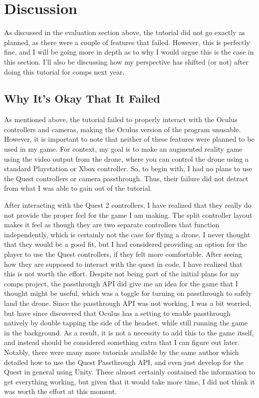\documentclass[10pt,twocolumn]{article}
\begin{document}
\section{Discussion}
As discussed in the evaluation section above, the tutorial did not go exactly as planned, as there were a couple of features that failed. However, this is perfectly fine, and I will be going more in depth as to why I would argue this is the case in this section. I'll also be discussing how my perspective has shifted (or not) after doing this tutorial for comps next year.


\subsection{Why It's Okay That It Failed}
As mentioned above, the tutorial failed to properly interact with the Oculus controllers and cameras, making the Oculus version of the program unusable. However, it is important to note that neither of these features were planned to be used in my game. For context, my goal is to make an augmented reality game using the video output from the drone, where you can control the drone using a standard Playstation or Xbox controller. So, to begin with, I had no plans to use the Quest controllers or camera passthrough. Thus, their failure did not detract from what I was able to gain out of the tutorial.

After interacting with the Quest 2 controllers, I have realized that they really do not provide the proper feel for the game I am making. The split controller layout makes it feel as though they are two separate controllers that function independently, which is certainly not the case for flying a drone. I never thought that they would be a good fit, but I had considered providing an option for the player to use the Quest controllers, if they felt more comfortable. After seeing how they are supposed to interact with the quest in code, I have realized that this is not worth the effort. Despite not being part of the initial plans for my comps project, the passthrough API did give me an idea for the game that I thought might be useful, which was a toggle for turning on passthrough to safely land the drone. Since the passthrough API was not working, I was a bit worried, but have since discovered that Oculus has a setting to enable passthrough natively by double tapping the side of the headset, while still running the game in the background. As a result, it is not a necessity to add this to the game itself, and instead should be considered something extra that I can figure out later. Notably, there were many more tutorials available by the same author which detailed how to use the Quest Passthrough API, and even just develop for the Quest in general using Unity. These almost certainly contained the information to get everything working, but given that it would take more time, I did not think it was worth the effort at this moment.
\end{document}
